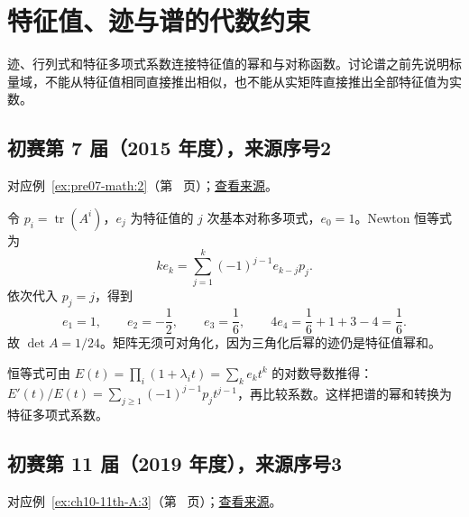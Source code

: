 \documentclass[UTF8,12pt,a4paper,fontset=fandol]{ctexart}
\begin{document}
\section{特征值、迹与谱的代数约束}

\label{sec:solutions-3}

迹、行列式和特征多项式系数连接特征值的幂和与对称函数。讨论谱之前先说明标量域，不能从特征值相同直接推出相似，也不能从实矩阵直接推出全部特征值为实数。

\subsection{初赛第 7 届（2015 年度），来源序号2}\label{ans:pre07-math:2}\label{pr:pre07-math:2}

对应例~\ref{ex:pre07-math:2}（第~\pageref{ex:pre07-math:2} 页）；\href{https://github.com/lzxcr/cmc-mathematics/blob/64916fa1fdbc3e444a652eca204d5669058ee321/src/problems/preliminary/07/02.md}{查看来源}。

\begin{solve}

令 $p_i=\operatorname{tr}(A^i)$，$e_j$ 为特征值的 $j$ 次基本对称多项式，$e_0=1$。Newton 恒等式为
\[
ke_k=\sum_{j=1}^k(-1)^{j-1}e_{k-j}p_j.
\]
依次代入 $p_j=j$，得到
\[
e_1=1,\qquad e_2=-\frac12,\qquad e_3=\frac16,
\qquad 4e_4=\frac16+1+3-4=\frac16.
\]
故 $\boxed{\det A=1/24}$。矩阵无须可对角化，因为三角化后幂的迹仍是特征值幂和。

\end{solve}

\begin{remark}[方法与条件]

恒等式可由 $E(t)=\prod_i(1+\lambda_it)=\sum_ke_kt^k$ 的对数导数推得：$E'(t)/E(t)=\sum_{j\ge1}(-1)^{j-1}p_jt^{j-1}$，再比较系数。这样把谱的幂和转换为特征多项式系数。

\end{remark}

\subsection{初赛第 11 届（2019 年度），来源序号3}\label{ans:ch10-11th-A:3}\label{pr:ch10-11th-A:3}

对应例~\ref{ex:ch10-11th-A:3}（第~\pageref{ex:ch10-11th-A:3} 页）；\href{https://github.com/lzxcr/cmc-mathematics/blob/64916fa1fdbc3e444a652eca204d5669058ee321/src/problems/preliminary/11/03.md}{查看来源}。
\end{document}
